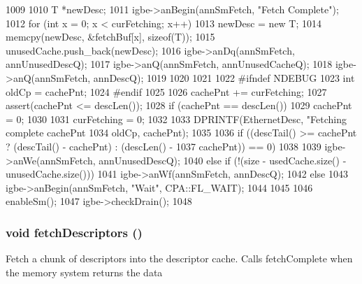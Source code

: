 \begin{DoxyCode}
1009 {
1010     T *newDesc;
1011     igbe->anBegin(annSmFetch, "Fetch Complete");
1012     for (int x = 0; x < curFetching; x++) {
1013         newDesc = new T;
1014         memcpy(newDesc, &fetchBuf[x], sizeof(T));
1015         unusedCache.push_back(newDesc);
1016         igbe->anDq(annSmFetch, annUnusedDescQ);
1017         igbe->anQ(annSmFetch, annUnusedCacheQ);
1018         igbe->anQ(annSmFetch, annDescQ);
1019     }
1020 
1021 
1022 #ifndef NDEBUG
1023     int oldCp = cachePnt;
1024 #endif
1025 
1026     cachePnt += curFetching;
1027     assert(cachePnt <= descLen());
1028     if (cachePnt == descLen())
1029         cachePnt = 0;
1030 
1031     curFetching = 0;
1032 
1033     DPRINTF(EthernetDesc, "Fetching complete cachePnt %
1034             oldCp, cachePnt);
1035 
1036     if ((descTail() >= cachePnt ? (descTail() - cachePnt) : (descLen() -
1037                                                              cachePnt)) == 0)
1038     {
1039         igbe->anWe(annSmFetch, annUnusedDescQ);
1040     } else if (!(size - usedCache.size() - unusedCache.size())) {
1041         igbe->anWf(annSmFetch, annDescQ);
1042     } else {
1043         igbe->anBegin(annSmFetch, "Wait", CPA::FL_WAIT);
1044     }
1045 
1046     enableSm();
1047     igbe->checkDrain();
1048 }
\end{DoxyCode}
\hypertarget{classIGbE_1_1DescCache_a69c2eb368f23448d28ccb10dfa67c250}{
\subsubsection[{fetchDescriptors}]{\setlength{\rightskip}{0pt plus 5cm}void fetchDescriptors ()}}
\label{classIGbE_1_1DescCache_a69c2eb368f23448d28ccb10dfa67c250}
Fetch a chunk of descriptors into the descriptor cache. Calls fetchComplete when the memory system returns the data 


